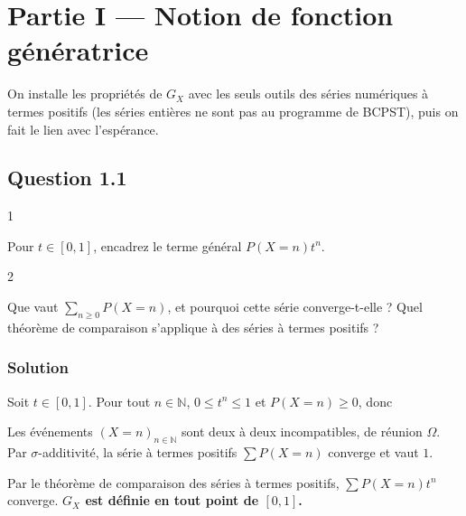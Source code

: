 \documentclass[11pt,a4paper]{article}
\newcommand{\equationajustee}[1]{%
  \sbox{\boiteequation}{$\displaystyle #1$}%
  \ifdim\wd\boiteequation>\linewidth
    \[\resizebox{\linewidth}{!}{\usebox{\boiteequation}}\]%
  \else
    \[#1\]%
  \fi}
\begin{document}
\hypertarget{partie-i-notion-de-fonction-guxe9nuxe9ratrice}{%
\section{Partie I --- Notion de fonction génératrice}\label{partie-i-notion-de-fonction-guxe9nuxe9ratrice}}

On installe les propriétés de \(G_X\) avec les seuls outils des séries numériques à termes positifs (les séries entières ne sont pas au programme de BCPST), puis on fait le lien avec l'espérance.

\hypertarget{question-1.1}{%
\subsection{Question 1.1}\label{question-1.1}}

\begin{indication}{1}

Pour \(t\in[0,1]\), encadrez le terme général \(P(X=n)t^n\).

\end{indication}

\begin{indication}{2}

Que vaut \(\sum_{n\ge0}P(X=n)\), et pourquoi cette série converge-t-elle ? Quel théorème de comparaison s'applique à des séries à termes positifs ?

\end{indication}

\hypertarget{solution}{%
\subsubsection{Solution}\label{solution}}

Soit \(t\in[0,1]\). Pour tout \(n\in\mathbb N\), \(0\le t^n\le1\) et \(P(X=n)\ge0\), donc

\equationajustee{\begin{aligned}
0&\le P(X=n)\,t^n\\
&\le P(X=n).
\end{aligned}}

Les événements \((X=n)_{n\in\mathbb N}\) sont deux à deux incompatibles, de réunion \(\Omega\). Par \(\sigma\)-additivité, la série à termes positifs \(\sum P(X=n)\) converge et vaut \(1\).

Par le théorème de comparaison des séries à termes positifs, \(\sum P(X=n)t^n\) converge. \textbf{\(G_X\) est définie en tout point de \([0,1]\).}
\end{document}
